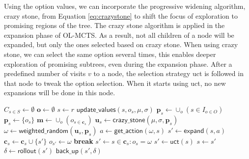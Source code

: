 Using the option values, we can incorporate the progressive widening algorithm,
crazy stone, from Equation \ref{eq:crazystone} to shift the focus of exploration
to promising regions of the tree. The crazy stone algorithm is applied in the
expansion phase of OL-MCTS.  As a result, not all children of a node will be
expanded, but only the ones selected based on crazy stone. When using crazy
stone, we can select the same option several times, this enables deeper
exploration of promising subtrees, even during the expansion phase. After a
predefined number of visits $v$ to a node, the selection strategy \textsf{uct}
is followed in that node to tweak the option selection. When it starts using
\textsf{uct}, no new expansions will be done in this node.

\begin{algorithm}[h]
	\caption{$\mathsf{OL-MCTS}(O, r, t, d, v, \mu, \sigma)$}
	\label{alg:olmcts}
	\begin{algorithmic}[1]
		\State $C_{s \in S} \gets \emptyset$
		\State $\mathbf{o} \gets \emptyset$
		 \label{alg:olmcts:mainloop}
			\State $s \gets r$
			 \label{alg:olmcts:innerloop}
				 \label{alg:olmcts:sp}
					\State $\mathsf{update\_values}(s, o_s, \mu, \sigma)$
						 \label{alg:olmcts:update}
					\State $\mathbf{p}_s \gets \cup_o (s \in I_{o \in O})$
				\Else
					\State $\mathbf{p}_s \gets \{o_s\}$
				\EndIf \label{alg:olmcts:scs}
				\State $\mathbf{m} \gets \cup_o (o_{s \in \mathbf{c}_s})$
				 
					\label{alg:olmcts:ns}
					\State $\mathbf{u}_s \gets \mathsf{crazy\_stone}(\mu, \sigma, \mathbf{p}_s)$
					\State $\omega \gets \mathsf{weighted\_random}(\mathbf{u}_s, \mathbf{p}_s)$
					 
						\State $a \gets \mathsf{get\_action}(\omega, s)$ \label{alg:olmcts:scs}
						\State $s' \gets \mathsf{expand}(s, a)$ 
						\State $\mathbf{c}_s \gets \mathbf{c}_s \cup \{s'\}$
						\State $o_{s'} \gets \omega$
						\State \textbf{break} \label{alg:olmcts:ecs}
					\Else {}
						\State $s' \gets s \in \mathbf{c}_s : o_s = \omega$ \label{alg:olmcts:s} 
					\EndIf
				\Else {}
					\State $s' \gets \mathsf{uct}(s)$ \label{alg:olmcts:uct}
				\EndIf \label{alg:olmcts:ecs}
				\State $s \gets s'$ \label{alg:olmcts:ss}
			\EndWhile
			\State $\delta \gets \mathsf{rollout}(s')$ \label{alg:olmcts:rollout}
			\State $\mathsf{back\_up}(s', \delta)$ \label{alg:olmcts:backup}
		\EndWhile
	\end{algorithmic}
\end{algorithm}

